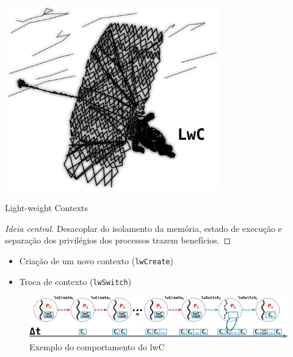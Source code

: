 \documentclass[xcolor={usenames,svgnames,dvipsnames},brazil,english,12pt,aspectratio=149]{beamer}
\begin{document}
\begin{frame}[plain]
  \includegraphics[width=0.7\textwidth]{presentation_cap2_eight}
\end{frame}

\begin{frame}{Light-weight Contexts}

  \begin{proof}[Ideia central]
Desacoplar do isolamento da memória, estado de execução e separação dos
privilégios dos processos trazem benefícios.
  \end{proof}

  \begin{itemize}
    \item Criação de um novo contexto (\texttt{lwCreate})
    \item Troca de contexto (\texttt{lwSwitch})
  \end{itemize}

  \begin{figure}[!h]
    \centering
    \includegraphics[width=\textwidth]{lwC} 
    \caption*{Exemplo do comportamento do lwC}
  \end{figure}

\end{frame}


\end{document}
